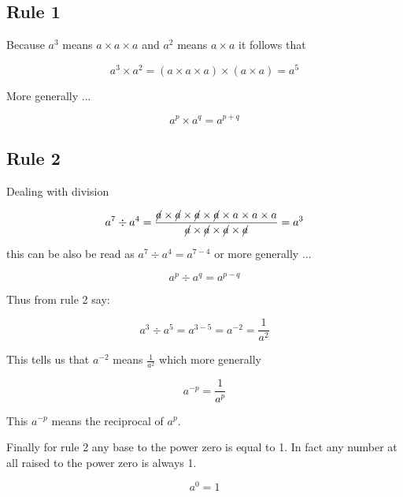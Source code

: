\subsection{Rule 1}

Because $ a^{3} $ means $ a \times a \times a $ and $ a^{2} $ means $ a \times a $ it follows that  

\begin{equation}
  a^{3} \times a^{2} = ( a \times a \times a ) \times ( a \times a ) = a^{5}
\end{equation}

More generally ...

\begin{equation}
  a^{p} \times a^{q} = a^{p + q}
\end{equation}

\subsection{Rule 2}

Dealing with division

\begin{equation}
  a^{7} \div a^{4} =\frac{\cancel{a} \times \cancel{a} \times \cancel{a}\times \cancel{a}\times a\times a\times a}{\cancel{a}\times \cancel{a}\times \cancel{a}\times \cancel{a}} = a^{3}
\end{equation}

this can be also be read as $ a^{7} \div a^{4} = a^{7-4} $ or more generally ...

\begin{equation}
  a^{p} \div a^{q} = a^{p - q}
\end{equation}

Thus from rule 2 say:

\begin{equation}
  a^{3} \div a^{5} = a^{3 - 5} = a^{-2} = \frac{1}{a^{2}}
\end{equation}

This tells us that $a^{-2}$ means $ \frac{1}{a^{2}} $ which more generally 

\begin{equation}
  a^{-p} = \frac{1}{a^{p}}
\end{equation}

This $a^{-p}$ means the reciprocal of $a^{p}$. 

Finally for rule 2 any base to the power zero is equal to 1. In fact any number at all raised to the power zero is always 1. 

\begin{equation}
  a^{0} = 1
\end{equation}

